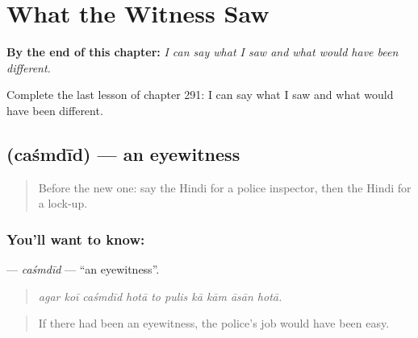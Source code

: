 
\chapter{What the Witness Saw}
\label{ch:hi-what-the-witness-saw}

\begin{chapteropening}
\textbf{By the end of this chapter:} \emph{I can say what I saw and what would have been different.}

Complete the last lesson of chapter 291: I can say what I saw and what would have been different.
\end{chapteropening}

\section[\texorpdfstring{\hi{चश्मदीद} (caśmdīd)}{चश्मदीद (caśmdīd)}]{ (caśmdīd) — an eyewitness}

\label{lesson:HI-C291-casmdid}



\begin{quote}
Before the new one: say the Hindi for a police inspector, then the Hindi for a lock-up.
\end{quote}

\subsection*{You'll want to know: }
\textbf{} — \emph{caśmdīd} — \textquotedblleft{}an eyewitness\textquotedblright{}.

\begin{quote}
         
\end{quote}

\begin{quote}
\emph{agar koī caśmdīd hotā to pulis kā kām āsān hotā.}
\end{quote}

\begin{quote}
If there had been an eyewitness, the police's job would have been easy.
\end{quote}

